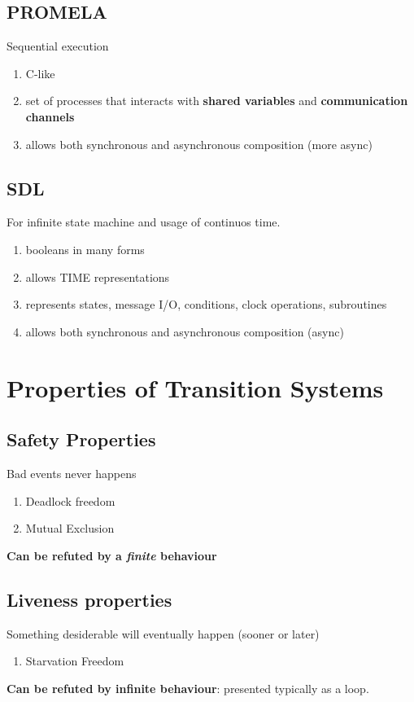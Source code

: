 \documentclass[11pt]{article}
\begin{document}
\subsection{PROMELA} %
\label{sub:promela}
Sequential execution
\begin{enumerate}
	\item C-like
	\item set of processes that interacts with \textbf{shared variables} and \textbf{communication channels}
	\item allows both synchronous and asynchronous composition (more async)
\end{enumerate}

\subsection{SDL} %
\label{sub:sdl}
For infinite state machine and usage of continuos time.
\begin{enumerate}
	\item booleans in many forms
	\item allows TIME representations
	\item represents states, message I/O, conditions, clock operations, subroutines
	\item allows both synchronous and asynchronous composition (async)
\end{enumerate}


\section{Properties of Transition Systems} %
\label{sec:properties_of_transition_systems}
\subsection{Safety Properties} %
\label{sub:safety_properties}
Bad events never happens
\begin{enumerate}
	\item Deadlock freedom
	\item Mutual Exclusion
\end{enumerate}
\textbf{Can be refuted by a \textit{finite} behaviour}

\subsection{Liveness properties} %
\label{sub:liveness_properties}
Something desiderable will eventually happen (sooner or later)
\begin{enumerate}
	\item Starvation Freedom
\end{enumerate}
\textbf{Can be refuted by infinite behaviour}: presented typically as a loop.
\end{document}
